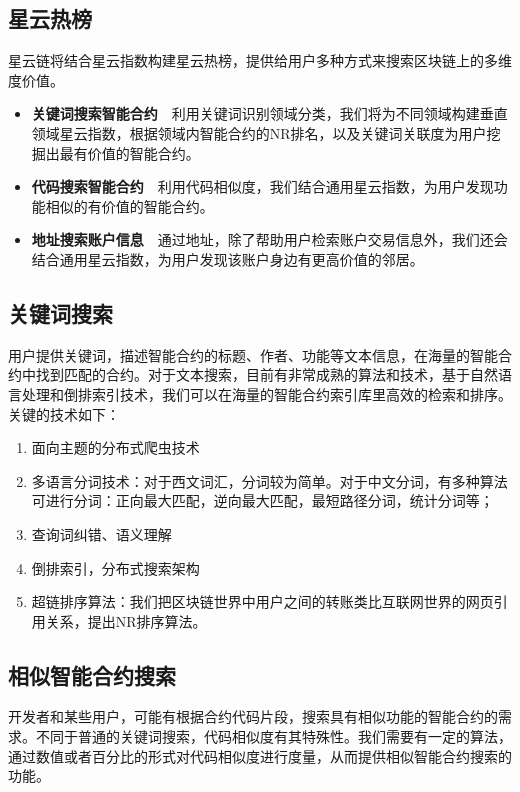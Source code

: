 \subsection{星云热榜}
星云链将结合星云指数构建星云热榜，提供给用户多种方式来搜索区块链上的多维度价值。
\begin{itemize}
\item \textbf{关键词搜索智能合约}~~利用关键词识别领域分类，我们将为不同领域构建垂直领域星云指数，根据领域内智能合约的NR排名，以及关键词关联度为用户挖掘出最有价值的智能合约。
\item \textbf{代码搜索智能合约}~~利用代码相似度，我们结合通用星云指数，为用户发现功能相似的有价值的智能合约。
\item \textbf{地址搜索账户信息}~~通过地址，除了帮助用户检索账户交易信息外，我们还会结合通用星云指数，为用户发现该账户身边有更高价值的邻居。
\end{itemize}


\subsection{关键词搜索}
用户提供关键词，描述智能合约的标题、作者、功能等文本信息，在海量的智能合约中找到匹配的合约。对于文本搜索，目前有非常成熟的算法和技术，基于自然语言处理和倒排索引技术，我们可以在海量的智能合约索引库里高效的检索和排序。关键的技术如下：
\begin{enumerate}
	\item 面向主题的分布式爬虫技术
	\item 多语言分词技术：对于西文词汇，分词较为简单。对于中文分词，有多种算法可进行分词：正向最大匹配，逆向最大匹配，最短路径分词，统计分词等；
	\item 查询词纠错、语义理解
	\item 倒排索引，分布式搜索架构
	\item 超链排序算法：我们把区块链世界中用户之间的转账类比互联网世界的网页引用关系，提出NR排序算法。
\end{enumerate}


\subsection{相似智能合约搜索}
开发者和某些用户，可能有根据合约代码片段，搜索具有相似功能的智能合约的需求。不同于普通的关键词搜索，代码相似度有其特殊性。我们需要有一定的算法，通过数值或者百分比的形式对代码相似度进行度量，从而提供相似智能合约搜索的功能。

